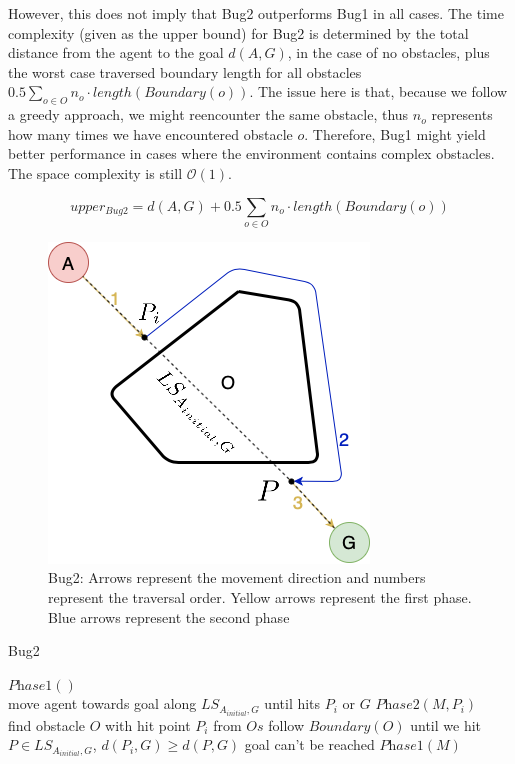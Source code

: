 However, this does not imply that Bug2 outperforms Bug1 in all cases. The time complexity (given as the upper bound) for Bug2 is determined by the total distance from the agent to the goal $d(A, G)$, in the case of no obstacles, plus the worst case traversed boundary length for all obstacles $0.5 \sum_{o \in O} n_{o} \cdot length(Boundary(o))$. The issue here is that, because we follow a greedy approach, we might reencounter the same obstacle, thus $n_{o}$ represents how many times we have encountered obstacle $o$. Therefore, Bug1 might yield better performance in cases where the environment contains complex obstacles. The space complexity is still $\mathcal{O}(1)$.

$$upper_{Bug2} = d(A, G) + 0.5 \sum_{o \in O} n_{o} \cdot length(Boundary(o))$$

\begin{figure}[h!]
  \centering
  \includegraphics[scale=0.4]{images/Bug2.png}
  
  \caption{Bug2: Arrows represent the movement direction and numbers represent the traversal order. Yellow arrows represent the first phase. Blue arrows represent the second phase}
  \label{fig:Bug2}
\end{figure}

\begin{algorithm}[h]
\caption{Bug2}
\label{alg: bug2}
\begin{algorithmic}[1]
    \State $\textit{Phase1}()$
\EndProcedure
\\
    \State move agent towards goal along $LS_{A_{initial}, G}$ until hits $P_i$ or $G$
        \State \Return
    \EndIf
    \State $\textit{Phase2}(M, P_i)$
\EndProcedure
\\
    \State find obstacle $O$ with hit point $P_i$ from $Os$
    \State follow $Boundary(O)$ until we hit $P \in LS_{A_{initial}, G}$, $d(P_{i}, G) \geq d(P, G)$
    \State
        \State goal can't be reached
        \State \Return
    \EndIf
    \State
    \State $\textit{Phase1}(M)$
\EndProcedure
\end{algorithmic}
\end{algorithm}

